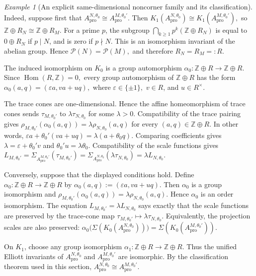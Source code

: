 \documentclass[11pt]{amsart}
\theoremstyle{definition}
\theoremstyle{remark}
\newtheorem{example}[theorem]{Example}
\newcommand{\Z}{\mathbb{Z}}
\newcommand{\ex}{\mathrm{pro}}
\begin{document}
\begin{example}[An explicit same-dimensional noncorner family and its classification]
Indeed, suppose first that $A_{\ex}^{N,\theta_0}\cong A_{\ex}^{M,\theta_0'}.$
Then $K_1(A_{\ex}^{N,\theta_0})
\cong
K_1(A_{\ex}^{M,\theta_0'}),$
so $\Z\oplus R_N\cong \Z\oplus R_M.$
For a prime $p$, the subgroup $
\bigcap_{k\geq1}p^k(\Z\oplus R_N)$
is equal to $0\oplus R_N$ if $p\mid N$, and is zero if $p\nmid N$.
This is an isomorphism invariant of the abelian group. Hence $\mathcal P(N)=\mathcal P(M),$
and therefore $R_N=R_M=:R.$

The induced isomorphism on $K_0$ is a group automorphism $\alpha_0\colon \Z\oplus R\longrightarrow \Z\oplus R.
$ Since $\operatorname{Hom}(R,\Z)=0,$
every group automorphism of $\Z\oplus R$ has the form $\alpha_0(a,q)=(\varepsilon a,va+uq),$
where $\varepsilon\in\{\pm1\},$ $v\in R$, and $u\in R^\times$.

The trace cones are one-dimensional. Hence the affine homeomorphism of trace
cones sends $\tau_{M,\theta_0'}$ to $\lambda\tau_{N,\theta_0}$
for some $\lambda>0$. Compatibility of the trace pairing gives $\rho_{M,\theta_0'}(\alpha_0(a,q))=\lambda\rho_{N,\theta_0}(a,q)$
for every $(a,q)\in\Z\oplus R$. In other words, $\varepsilon a+\theta_0'(va+uq)=\lambda(a+\theta_0q).$
Comparing coefficients gives
$\lambda=\varepsilon+\theta_0'v$ and $
\theta_0'u=\lambda\theta_0.$
Compatibility of the scale functions gives $L_{M,\theta_0'}=\Sigma_{A_{\ex}^{M,\theta_0'}}(\tau_{M,\theta_0'})=
\Sigma_{A_{\ex}^{N,\theta_0}}(\lambda\tau_{N,\theta_0})=\lambda L_{N,\theta_0}.$

Conversely, suppose that the displayed conditions hold. Define $\alpha_0\colon \Z\oplus R\to\Z\oplus R$ by
$\alpha_0(a,q):=(\varepsilon a,va+uq).$
Then $\alpha_0$ is a group isomorphism and
$\rho_{M,\theta_0'}(\alpha_0(a,q))=\lambda\rho_{N,\theta_0}(a,q).$
Hence $\alpha_0$ is an order isomorphism. The equation
$L_{M,\theta_0'}=\lambda L_{N,\theta_0}$
says exactly that the scale functions are preserved by the trace-cone map $\tau_{M,\theta_0'}\longmapsto \lambda\tau_{N,\theta_0}.$
Equivalently, the projection scales are also preserved: $\alpha_0\bigl(\Sigma(K_0(A_{\ex}^{N,\theta_0}))\bigr)=\Sigma(K_0(A_{\ex}^{M,\theta_0'})).$

On $K_1$, choose any group isomorphism $\alpha_1\colon \Z\oplus R\longrightarrow \Z\oplus R.$
Thus the unified Elliott invariants of
$A_{\ex}^{N,\theta_0}$ and $A_{\ex}^{M,\theta_0'}$ are isomorphic. By the
classification theorem used in this section,
$A_{\ex}^{N,\theta_0}\cong A_{\ex}^{M,\theta_0'}.$
\end{example}
\end{document}
